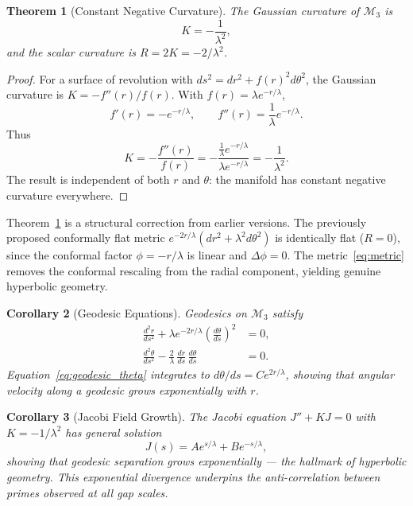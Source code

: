 \documentclass[12pt]{article}
\newtheorem{theorem}{Theorem}[section]
\newtheorem{corollary}[theorem]{Corollary}
\begin{document}
\begin{theorem}[Constant Negative Curvature]
The Gaussian curvature of $\mathcal{M}_3$ is
\begin{equation}
  K = -\frac{1}{\lambda^2},
  \label{eq:curvature}
\end{equation}
and the scalar curvature is $R = 2K = -2/\lambda^2$.
\label{thm:curvature}
\end{theorem}

\begin{proof}
For a surface of revolution with $ds^2 = dr^2 + f(r)^2 d\theta^2$, the Gaussian
curvature is $K = -f''(r)/f(r)$. With $f(r) = \lambda e^{-r/\lambda}$,
\[
  f'(r) = -e^{-r/\lambda}, \qquad
  f''(r) = \frac{1}{\lambda} e^{-r/\lambda}.
\]
Thus
\[
  K = -\frac{f''(r)}{f(r)} = -\frac{\frac{1}{\lambda} e^{-r/\lambda}}{\lambda e^{-r/\lambda}}
    = -\frac{1}{\lambda^2}.
\]
The result is independent of both $r$ and $\theta$: the manifold has constant
negative curvature everywhere.
\end{proof}

Theorem~\ref{thm:curvature} is a structural correction from earlier versions.
The previously proposed conformally flat metric $e^{-2r/\lambda}(dr^2 + \lambda^2 d\theta^2)$
is identically flat ($R = 0$), since the conformal factor $\phi = -r/\lambda$ is
linear and $\Delta\phi = 0$. The metric~\eqref{eq:metric} removes the conformal
rescaling from the radial component, yielding genuine hyperbolic geometry.

\begin{corollary}[Geodesic Equations]
Geodesics on $\mathcal{M}_3$ satisfy
\begin{align}
  \frac{d^2 r}{ds^2} + \lambda e^{-2r/\lambda}\left(\frac{d\theta}{ds}\right)^2 &= 0,
  \label{eq:geodesic_r} \\
  \frac{d^2 \theta}{ds^2} - \frac{2}{\lambda}\,\frac{dr}{ds}\,\frac{d\theta}{ds} &= 0.
  \label{eq:geodesic_theta}
\end{align}
Equation~\eqref{eq:geodesic_theta} integrates to $d\theta/ds = C e^{2r/\lambda}$,
showing that angular velocity along a geodesic grows exponentially with $r$.
\end{corollary}

\begin{corollary}[Jacobi Field Growth]
The Jacobi equation $J'' + K J = 0$ with $K = -1/\lambda^2$ has general solution
\begin{equation}
  J(s) = A e^{s/\lambda} + B e^{-s/\lambda},
  \label{eq:jacobi}
\end{equation}
showing that geodesic separation grows exponentially --- the hallmark of
hyperbolic geometry. This exponential divergence underpins the anti-correlation
between primes observed at all gap scales.
\end{corollary}
\end{document}
